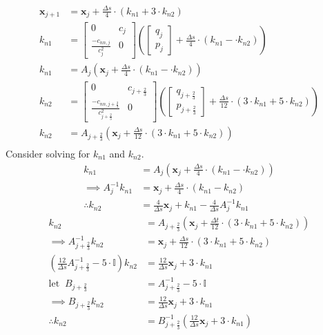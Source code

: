 \documentclass{article}
\begin{document}
\begin{align*}
  \bm{x}_{j+1} &= \bm{x}_j + \frac{\Delta s}{4}\cdot\left(k_{n1} + 3\cdot k_{n2}\right)\\
  k_{n1} &= \begin{bmatrix} 0 & c_j \\ \frac{-c_{nn, j}}{c^2_j} & 0\end{bmatrix}\left(\begin{bmatrix} q_j \\ p_j\end{bmatrix} + \frac{\Delta s}{4}\cdot(k_{n1} - \cdot k_{n2}) \right)\\
  k_{n1} &= A_j\left(\bm{x}_j + \frac{\Delta s}{4}\cdot(k_{n1} - \cdot k_{n2}) \right)\\
  k_{n2} &= \begin{bmatrix} 0 & c_{j + \frac{2}{3}} \\ \frac{-c_{nn, j + \frac{2}{3}}}{c^2_{j+\frac{2}{3}}} & 0\end{bmatrix}\left(\begin{bmatrix} q_{j+\frac{2}{3}} \\ p_{j+\frac{2}{3}}\end{bmatrix} + \frac{\Delta s}{12}\cdot(3\cdot k_{n1} + 5\cdot k_{n2}) \right)\\
  k_{n2} &= A_{j+\frac{2}{3}}\left(\bm{x}_j + \frac{\Delta s}{12}\cdot(3\cdot k_{n1} + 5\cdot k_{n2}) \right)\\
\end{align*}
Consider solving for $k_{n1}$ and $k_{n2}$.
\begin{align*}
  k_{n1} &= A_j\left(\bm{x}_j + \frac{\Delta s}{4}\cdot(k_{n1} - \cdot k_{n2}) \right)\\
  \implies A_j^{-1}k_{n1} &= \bm{x}_j + \frac{\Delta s}{4}\cdot(k_{n1} - k_{n2})\\
  \therefore k_{n2} &= \frac{4}{\Delta s}\bm{x}_j + k_{n1} - \frac{4}{\Delta s}A_j^{-1}k_{n1} 
\end{align*}
\begin{align*}
  k_{n2} &= A_{j+\frac{2}{3}}\left(\bm{x}_j + \frac{\Delta t}{12}\cdot(3\cdot k_{n1} + 5\cdot k_{n2}) \right)\\
  \implies A_{j+\frac{2}{3}}^{-1}k_{n2} &= \bm{x}_j + \frac{\Delta s}{12}\cdot(3\cdot k_{n1} + 5\cdot k_{n2})\\
  \left(\frac{12}{\Delta s}A_{j+\frac{2}{3}}^{-1} - 5\cdot\mathbb{I}\right)k_{n2} &= \frac{12}{\Delta s}\bm{x}_j + 3\cdot k_{n1}\\
  \mathrm{let\;\;} B_{j+\frac{2}{3}} &= A_{j+\frac{2}{3}}^{-1}-5\cdot\mathbb{I}\\
  \implies B_{j+\frac{2}{3}} k_{n2} &= \frac{12}{\Delta s}\bm{x}_j + 3\cdot k_{n1}\\
  \therefore k_{n2} &= B_{j+\frac{2}{3}}^{-1}\left(\frac{12}{\Delta s}\bm{x}_j + 3\cdot k_{n1} \right)
\end{align*}
\end{document}
